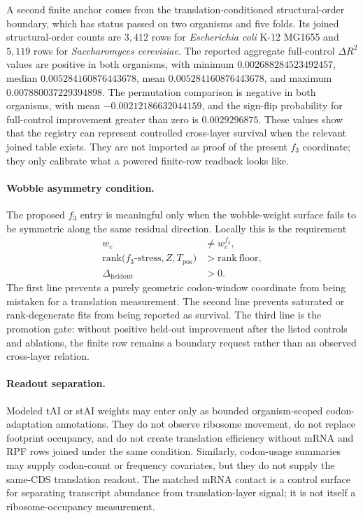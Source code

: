 A second finite anchor comes from the translation-conditioned structural-order boundary, which has status passed on two organisms and five folds.  Its joined structural-order counts are $3{,}412$ rows for \emph{Escherichia coli} K-12 MG1655 and $5{,}119$ rows for \emph{Saccharomyces cerevisiae}.  The reported aggregate full-control $\Delta R^2$ values are positive in both organisms, with minimum $0.002688284523492457$, median $0.005284160876443678$, mean $0.005284160876443678$, and maximum $0.007880037229394898$.  The permutation comparison is negative in both organisms, with mean $-0.00212186632044159$, and the sign-flip probability for full-control improvement greater than zero is $0.0029296875$.  These values show that the registry can represent controlled cross-layer survival when the relevant joined table exists.  They are not imported as proof of the present $f_3$ coordinate; they only calibrate what a powered finite-row readback looks like.

\paragraph{Wobble asymmetry condition.}
The proposed $f_3$ entry is meaningful only when the wobble-weight surface fails to be symmetric along the same residual direction.  Locally this is the requirement
$$
\begin{aligned}
w_c &\neq w_c^{f_3}, \\
\mathrm{rank}\bigl(f_3\text{-stress}, Z, T_{\mathrm{pos}}\bigr) &> \mathrm{rank\ floor}, \\
\Delta_{\mathrm{heldout}} &> 0.
\end{aligned}
$$
The first line prevents a purely geometric codon-window coordinate from being mistaken for a translation measurement.  The second line prevents saturated or rank-degenerate fits from being reported as survival.  The third line is the promotion gate: without positive held-out improvement after the listed controls and ablations, the finite row remains a boundary request rather than an observed cross-layer relation.

\paragraph{Readout separation.}
Modeled tAI or stAI weights may enter only as bounded organism-scoped codon-adaptation annotations.  They do not observe ribosome movement, do not replace footprint occupancy, and do not create translation efficiency without mRNA and RPF rows joined under the same condition.  Similarly, codon-usage summaries may supply codon-count or frequency covariates, but they do not supply the same-CDS translation readout.  The matched mRNA contact is a control surface for separating transcript abundance from translation-layer signal; it is not itself a ribosome-occupancy measurement.

